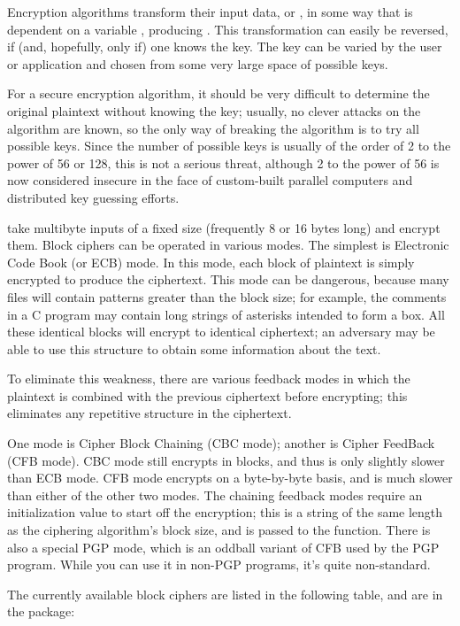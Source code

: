 \documentclass{howto}
\begin{document}
Encryption algorithms transform their input data, or ,
in some way that is dependent on a variable , producing
. This transformation can easily be reversed, if (and,
hopefully, only if) one knows the key.  The key can be varied by the
user or application and chosen from some very large space of possible
keys.

For a secure encryption algorithm, it should be very difficult to
determine the original plaintext without knowing the key; usually, no
clever attacks on the algorithm are known, so the only way of breaking
the algorithm is to try all possible keys. Since the number of possible
keys is usually of the order of 2 to the power of 56 or 128, this is not
a serious threat, although 2 to the power of 56 is now considered
insecure in the face of custom-built parallel computers and distributed
key guessing efforts.

 take multibyte inputs of a fixed size
(frequently 8 or 16 bytes long) and encrypt them.  Block ciphers can
be operated in various modes.  The simplest is Electronic Code Book
(or ECB) mode.  In this mode, each block of plaintext is simply
encrypted to produce the ciphertext.  This mode can be dangerous,
because many files will contain patterns greater than the block size;
for example, the comments in a C program may contain long strings of
asterisks intended to form a box.  All these identical blocks will
encrypt to identical ciphertext; an adversary may be able to use this
structure to obtain some information about the text.

To eliminate this weakness, there are various feedback modes in which
the plaintext is combined with the previous ciphertext before
encrypting; this eliminates any repetitive structure in the
ciphertext.   

One mode is Cipher Block Chaining (CBC mode); another is Cipher
FeedBack (CFB mode).  CBC mode still encrypts in blocks, and thus is
only slightly slower than ECB mode.  CFB mode encrypts on a
byte-by-byte basis, and is much slower than either of the other two
modes.  The chaining feedback modes require an initialization value to
start off the encryption; this is a string of the same length as the
ciphering algorithm's block size, and is passed to the 
function.  There is also a special PGP mode, which is an oddball
variant of CFB used by the PGP program.  While you can use it in
non-PGP programs, it's quite non-standard.

The currently available block ciphers are listed in the following table,
and are in the  package:
\end{document}

